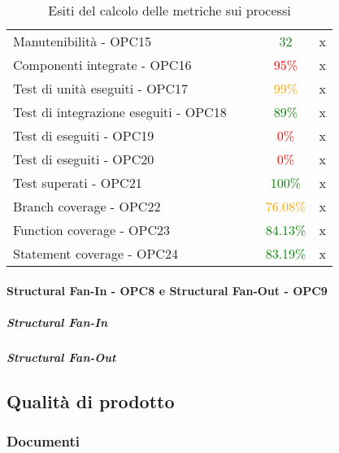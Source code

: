 \documentclass[PdQ.tex]{subfiles}
\begin{document}
\begin{table}[H]
\begin{tabular}{l c c c c}
					\rule[0cm]{0cm}{0.4cm}
					Manutenibilità - OPC15 & & & \textcolor{green}{32} & x \\
					\rule[0cm]{0cm}{0.4cm}
					Componenti integrate - OPC16 & & & \textcolor{red}{95\%} & x \\
					\rule[0cm]{0cm}{0.4cm}
					Test di unità eseguiti - OPC17 & & & \textcolor{orange}{99\%} & x \\
					\rule[0cm]{0cm}{0.4cm}
					Test di integrazione eseguiti - OPC18 & & & \textcolor{green}{89\%} & x \\
					\rule[0cm]{0cm}{0.4cm}
					Test di \gl{sistema} eseguiti - OPC19 & & & \textcolor{red}{0\%} & x \\
					\rule[0cm]{0cm}{0.4cm}
					Test di \gl{validazione} eseguiti - OPC20 & & & \textcolor{red}{0\%} & x \\
					\rule[0cm]{0cm}{0.4cm}
					Test superati - OPC21 & & & \textcolor{green}{100\%} & x \\
					\rule[0cm]{0cm}{0.4cm}
					Branch coverage - OPC22 & & & \textcolor{orange}{76.08\%} & x \\
					\rule[0cm]{0cm}{0.4cm}
					Function coverage - OPC23 & & & \textcolor{green}{84.13\%} & x \\
					\rule[0cm]{0cm}{0.4cm}
					Statement coverage - OPC24 & & & \textcolor{green}{83.19\%} & x \\

					\hline
				\end{tabular}
				\caption{Esiti del calcolo delle metriche sui processi}
			\end{table}
		\newpage
		\paragraph{Structural Fan-In - OPC8 e Structural Fan-Out - OPC9}
		\subparagraph{Structural Fan-In}
		
		\subparagraph{Structural Fan-Out}
		

\newpage
\subsection{Qualità di prodotto}
	\subsubsection{Documenti}
\end{document}
